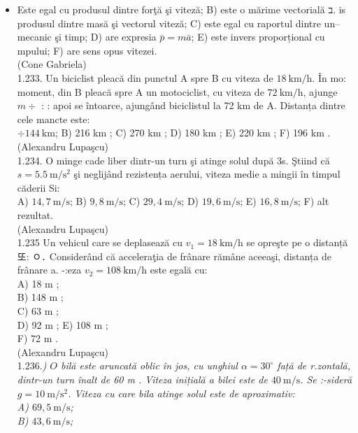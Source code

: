 \documentclass[10pt]{article}
\begin{document}
\begin{itemize}
  \item Este egal cu produsul dintre forţă şi viteză; B) este o mărime vectorială ב. is produsul dintre masă şi vectorul viteză; C) este egal cu raportul dintre un-- mecanic şi timp; D) are expresia $\bar{p}=m \bar{a}$; E) este invers proporțional cu mpului; F) are sens opus vitezei.\\
(Cone Gabriela)\\
1.233. Un biciclist pleacă din punctul A spre B cu viteza de $18 \mathrm{~km} / \mathrm{h}$. În mo: moment, din B pleacă spre A un motociclist, cu viteza de $72 \mathrm{~km} / \mathrm{h}$, ajunge $m \div$ : : apoi se întoarce, ajungând biciclistul la 72 km de A. Distanța dintre cele mancte este:\\
$\div 144 \mathrm{~km}$; B) 216 km ; C) 270 km ; D) 180 km ; E) 220 km ; F) 196 km .\\
(Alexandru Lupaşcu)\\
1.234. O minge cade liber dintr-un turn şi atinge solul după 3s. Ştiind că $s=5.5 \mathrm{~m} / \mathrm{s}^{2}$ şi neglijând rezistența aerului, viteza medie a mingii în timpul căderii Si:\\
A) $14,7 \mathrm{~m} / \mathrm{s}$; B) $9,8 \mathrm{~m} / \mathrm{s}$; C) $29,4 \mathrm{~m} / \mathrm{s}$; D) $19,6 \mathrm{~m} / \mathrm{s}$; E) $16,8 \mathrm{~m} / \mathrm{s}$; F) alt rezultat.\\
(Alexandru Lupaşcu)\\
1.235 Un vehicul care se deplasează cu $v_{1}=18 \mathrm{~km} / \mathrm{h}$ se opreşte pe o distanță 또: ㅇ․ Considerând că acceleraţia de frânare rămâne aceeaşi, distanța de frânare a. -:eza $v_{2}=108 \mathrm{~km} / \mathrm{h}$ este egală cu:\\
A) 18 m ;\\
B) 148 m ;\\
C) 63 m ;\\
D) 92 m ; E) 108 m ;\\
F) 72 m .\\
(Alexandru Lupaşcu)\\
1.236.\textit{) $O$ bilă este aruncată oblic în jos, cu unghiul $\alpha=30^{\circ}$ față de r.zontală, dintr-un turn înalt de 60 m . Viteza inițială a bilei este de $40 \mathrm{~m} / \mathrm{s}$. Se :-sideră $g=10 \mathrm{~m} / \mathrm{s}^{2}$. Viteza cu care bila atinge solul este de aproximativ:\\
A) $69,5 \mathrm{~m} / \mathrm{s}$;\\
B) $43,6 \mathrm{~m} / \mathrm{s}$;\\
}
\end{itemize}
\end{document}
